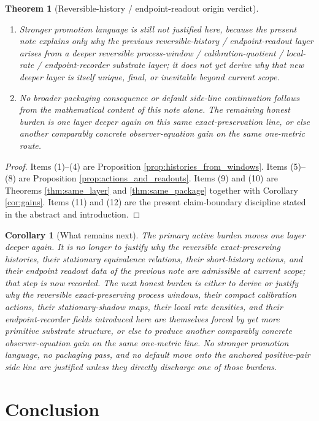 \documentclass[11pt]{article}
\newtheorem{corollary}{Corollary}
\newtheorem{theorem}{Theorem}
\begin{document}
\begin{theorem}[Reversible-history / endpoint-readout origin verdict]
\begin{enumerate}
    \item Stronger promotion language is still not justified here, because the present note explains only why the previous reversible-history / endpoint-readout layer arises from a deeper reversible process-window / calibration-quotient / local-rate / endpoint-recorder substrate layer; it does not yet derive why that new deeper layer is itself unique, final, or inevitable beyond current scope.
    \item No broader packaging consequence or default side-line continuation follows from the mathematical content of this note alone. The remaining honest burden is one layer deeper again on this same exact-preservation line, or else another comparably concrete observer-equation gain on the same one-metric route.
\end{enumerate}
\end{theorem}

\begin{proof}
Items (1)--(4) are Proposition \ref{prop:histories_from_windows}. Items (5)--(8) are Proposition \ref{prop:actions_and_readouts}. Items (9) and (10) are Theorems \ref{thm:same_layer} and \ref{thm:same_package} together with Corollary \ref{cor:gains}. Items (11) and (12) are the present claim-boundary discipline stated in the abstract and introduction.
\end{proof}

\begin{corollary}[What remains next]
\label{cor:what_next}
The primary active burden moves one layer deeper again. It is no longer to justify why the reversible exact-preserving histories, their stationary equivalence relations, their short-history actions, and their endpoint readout data of the previous note are admissible at current scope; that step is now recorded. The next honest burden is either to derive or justify why the reversible exact-preserving process windows, their compact calibration actions, their stationary-shadow maps, their local rate densities, and their endpoint-recorder fields introduced here are themselves forced by yet more primitive substrate structure, or else to produce another comparably concrete observer-equation gain on the same one-metric line. No stronger promotion language, no packaging pass, and no default move onto the anchored positive-pair side line are justified unless they directly discharge one of those burdens.
\end{corollary}

\section{Conclusion}
\end{document}
